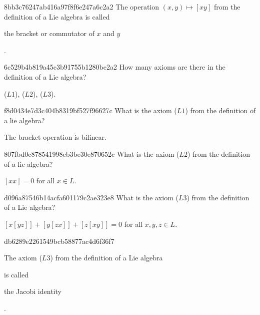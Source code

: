 \begin{note}{8bb3c76247ab416a97f8f6e247a6c2a2}
    The operation \( (x, y) \mapsto [xy] \)  from the definition of a Lie
    algebra is called \begin{icloze}{1}the bracket or commutator of \( x \) and
    \( y \)\end{icloze}.
\end{note}

\begin{note}{6c529b4b819a45c3b91755b1280be2a2}
    How many axioms are there in the definition of a Lie algebra?

    \begin{cloze}{1}
        (\( L 1 \)), (\( L 2 \)), (\( L 3 \)).
    \end{cloze}
\end{note}

\begin{note}{f8d0434e7d3c404b8319bf527f96627c}
    What is the axiom (\( L 1 \)) from the definition of a lie algebra?

    \begin{cloze}{1}
        The bracket operation is bilinear.
    \end{cloze}
\end{note}

\begin{note}{807fbd0c878541998eb3be30e870652c}
    What is the axiom (\( L 2 \)) from the definition of a lie algebra?

    \begin{cloze}{1}
        \( [x x] = 0 \) \quad for all \( x \in L \).
    \end{cloze}
\end{note}

\begin{note}{d096a87546b14acfa601179c2ae323e8}
    What is the axiom (\( L 3 \)) from the definition of a Lie algebra?

    \begin{cloze}{1}
        \( [x[yz]] + [y[zx]] + [z[xy]] = 0 \) \quad for all \( x,  y, z \in L \).
    \end{cloze}
\end{note}

\begin{note}{db6289e2261549bcb58877ac4d6f36f7}
    \begin{icloze}{2}The axiom (\( L 3 \)) from the definition of a Lie algebra\end{icloze} is called
    \begin{icloze}{1}the Jacobi identity\end{icloze}.
\end{note}

